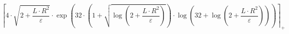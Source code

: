 \[\left\lceil 4 \cdot \sqrt{2 + \frac{L \cdot R^{2}}{\varepsilon}} \cdot \exp\left(32 \cdot \left(1 + \sqrt{\log\left(2 + \frac{L \cdot R^{2}}{\varepsilon}\right)}\right) \cdot \log\left(32 + \log\left(2 + \frac{L \cdot R^{2}}{\varepsilon}\right)\right)\right) \right\rceil_{+}\]
